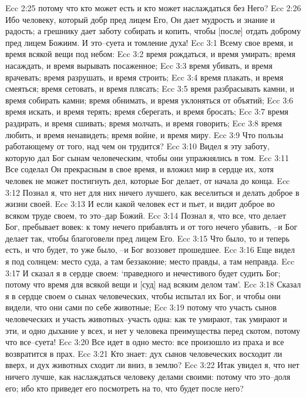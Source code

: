 Ecc 2:25  потому что кто может есть и кто может наслаждаться без Него?
Ecc 2:26  Ибо человеку, который добр пред лицем Его, Он дает мудрость и знание и радость; а грешнику дает заботу собирать и копить, чтобы [после] отдать доброму пред лицем Божиим. И это--суета и томление духа!
Ecc 3:1  Всему свое время, и время всякой вещи под небом:
Ecc 3:2  время рождаться, и время умирать; время насаждать, и время вырывать посаженное;
Ecc 3:3  время убивать, и время врачевать; время разрушать, и время строить;
Ecc 3:4  время плакать, и время смеяться; время сетовать, и время плясать;
Ecc 3:5  время разбрасывать камни, и время собирать камни; время обнимать, и время уклоняться от объятий;
Ecc 3:6  время искать, и время терять; время сберегать, и время бросать;
Ecc 3:7  время раздирать, и время сшивать; время молчать, и время говорить;
Ecc 3:8  время любить, и время ненавидеть; время войне, и время миру.
Ecc 3:9  Что пользы работающему от того, над чем он трудится?
Ecc 3:10  Видел я эту заботу, которую дал Бог сынам человеческим, чтобы они упражнялись в том.
Ecc 3:11  Все соделал Он прекрасным в свое время, и вложил мир в сердце их, хотя человек не может постигнуть дел, которые Бог делает, от начала до конца.
Ecc 3:12  Познал я, что нет для них ничего лучшего, как веселиться и делать доброе в жизни своей.
Ecc 3:13  И если какой человек ест и пьет, и видит доброе во всяком труде своем, то это--дар Божий.
Ecc 3:14  Познал я, что все, что делает Бог, пребывает вовек: к тому нечего прибавлять и от того нечего убавить, --и Бог делает так, чтобы благоговели пред лицем Его.
Ecc 3:15  Что было, то и теперь есть, и что будет, то уже было, --и Бог воззовет прошедшее.
Ecc 3:16  Еще видел я под солнцем: место суда, а там беззаконие; место правды, а там неправда.
Ecc 3:17  И сказал я в сердце своем: `праведного и нечестивого будет судить Бог; потому что время для всякой вещи и [суд] над всяким делом там'.
Ecc 3:18  Сказал я в сердце своем о сынах человеческих, чтобы испытал их Бог, и чтобы они видели, что они сами по себе животные;
Ecc 3:19  потому что участь сынов человеческих и участь животных--участь одна: как те умирают, так умирают и эти, и одно дыхание у всех, и нет у человека преимущества перед скотом, потому что все--суета!
Ecc 3:20  Все идет в одно место: все произошло из праха и все возвратится в прах.
Ecc 3:21  Кто знает: дух сынов человеческих восходит ли вверх, и дух животных сходит ли вниз, в землю?
Ecc 3:22  Итак увидел я, что нет ничего лучше, как наслаждаться человеку делами своими: потому что это--доля его; ибо кто приведет его посмотреть на то, что будет после него?
